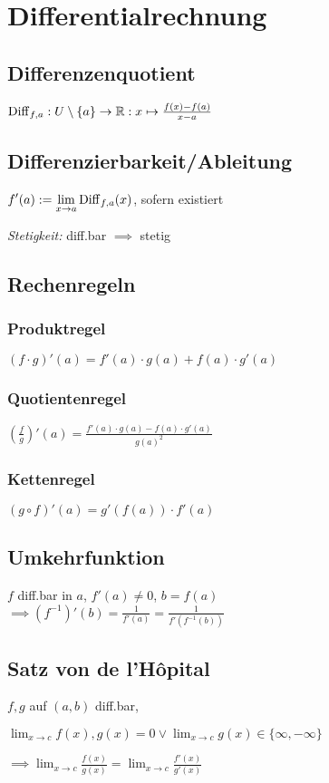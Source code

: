 \section*{Differentialrechnung}

\subsection*{Differenzenquotient}
$\operatorname{Diff}_{f,a}: U\setminus\{a\}\to\mathbb{R}: x\mapsto\frac{f(x)-f(a)}{x-a}$

\subsection*{Differenzierbarkeit/Ableitung}
$\displaystyle f'(a) := \lim_{x\to a}\operatorname{Diff}_{f,a}(x)$, sofern existiert

\textit{Stetigkeit:} diff.bar $\implies$ stetig

\subsection*{Rechenregeln}

\subsubsection*{Produktregel}
$(f \cdot g)'(a)=f'(a)\cdot g(a)+f(a)\cdot g'(a)$

\subsubsection*{Quotientenregel}
$\left(\frac{f}{g}\right)'(a)=\frac{f'(a)\cdot g(a) - f(a)\cdot g'(a)}{g(a)^2}$

\subsubsection*{Kettenregel}
$(g\circ f)'(a) = g'(f(a))\cdot f'(a)$

\subsection*{Umkehrfunktion}
$f$ diff.bar in $a$, $f'(a)\neq0$, $b=f(a)$ \\
$\implies (f^{-1})'(b) = \frac{1}{f'(a)}=\frac{1}{f'(f^{-1}(b))}$

\subsection*{Satz von de l'H\^opital}
$f,g$ auf $(a,b)$ diff.bar,

$\displaystyle \lim_{x\to c}f(x),g(x)=0 \lor
\lim_{x\to c}g(x)\in\{\infty,-\infty\}$

$\displaystyle \implies \lim_{x\to c}\frac{f(x)}{g(x)}=\lim_{x\to c}\frac{f'(x)}{g'(x)}$
